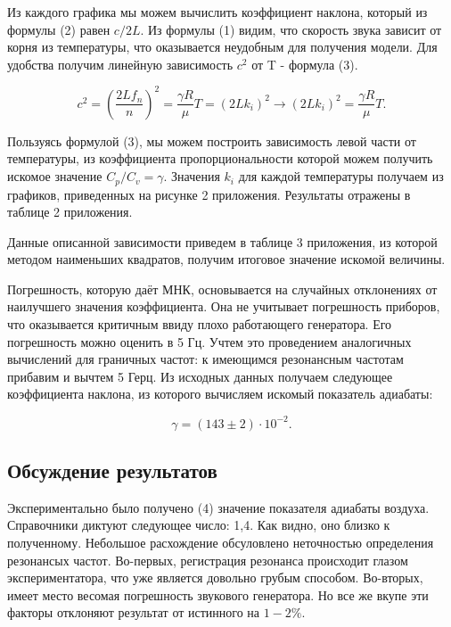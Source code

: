 \documentclass[a4paper, fontsize = 14pt]{article}
\begin{document}
Из каждого графика мы можем вычислить коэффициент наклона, который из формулы (2) равен $c/2L$. Из формулы (1) видим, что скорость звука зависит от корня из температуры, что оказывается неудобным для получения модели. Для удобства получим линейную зависимость $c^2$ от T - формула (3). 

\begin{equation}
c^2=(\frac{2Lf_n}{n})^2=\frac{\gamma R}{\mu}T = (2Lk_i)^2 \rightarrow (2Lk_i)^2=\frac{\gamma R}{\mu}T.
\end{equation}

Пользуясь формулой (3), мы можем построить зависимость левой части от температуры, из коэффициента пропорциональности которой можем получить искомое значение $C_p/C_v=\gamma$. Значения $k_i$ для каждой температуры получаем из графиков, приведенных на рисунке 2 приложения. Результаты отражены в таблице 2 приложения.

Данные описанной зависимости приведем в таблице 3 приложения, из которой методом наименьших квадратов, получим итоговое значение искомой величины. 

Погрешность, которую даёт МНК, основывается на случайных отклонениях от наилучшего значения коэффициента. Она не учитывает погрешность приборов, что оказывается критичным ввиду плохо работающего генератора. Его погрешность можно оценить в 5 Гц. Учтем это проведением аналогичных вычислений для граничных частот: к имеющимся резонансным частотам прибавим и вычтем 5 Герц. Из исходных данных получаем следующее коэффициента наклона, из которого вычисляем искомый показатель адиабаты:

\begin{equation}
\gamma = (143 \pm 2) \cdot 10^{-2}.
\end{equation}

\subsection*{Обсуждение результатов}

Экспериментально было получено (4) значение показателя адиабаты воздуха. Справочники диктуют следующее число: 1,4. Как видно, оно близко к полученному. Небольшое расхождение обсуловлено неточностью определения резонансых частот. Во-первых, регистрация резонанса происходит глазом экспериментатора, что уже является довольно грубым способом. Во-вторых, имеет место весомая погрешность звукового генератора. Но все же вкупе эти факторы отклоняют результат от истинного на $1-2\%$. 
\end{document}

